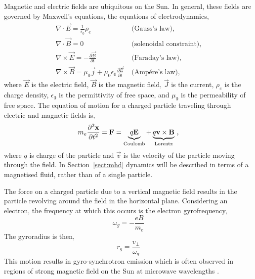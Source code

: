Magnetic and electric fields are ubiquitous on the Sun. %
In general, these fields are governed by Maxwell's equations, the equations of electrodynamics,
\begin{eqnarray}
\nabla \cdot \vec{E} = \frac{1}{\epsilon_0}\rho_e & \mbox{ (Gauss's law),} \\
\nabla \cdot \vec{B} = 0 & \mbox{ (solenoidal constraint),} \\
\nabla \times \vec{E} = -\frac{\partial \vec{B}}{\partial t} & \mbox{ (Faraday's law),} \\
\nabla \times \vec{B} = \mu_0\vec{j} + \mu_0 \epsilon_0 \frac{\partial \vec{E}}{\partial t} & \mbox{ (Amp\'ere's law),}
\end{eqnarray}
where $\vec{E}$ is the electric field, $\vec{B}$ is the magnetic field, $\vec{J}$ is the current, $\rho_e$ is the charge density, $\epsilon_0$ is the permittivity of free space, and $\mu_0$ is the permeability of free space. The equation of motion for a charged particle traveling through electric and magnetic fields is,
\begin{equation}\label{eqn:lorenz}
m_e \frac{\partial^2 \mathbf{x}}{\partial t^2} = \vec{F} = \underbrace{q\vec{E}}_{\mathrm{Coulomb}}+\underbrace{q\vec{v}\times\vec{B}}_{\mathrm{Lorentz}} \mbox{\,,}
\end{equation}
where $q$ is charge of the particle and $\vec{v}$ is the velocity of the particle moving through the field. In Section~\ref{sect:mhd} dynamics will be described in terms of a magnetised fluid, rather than of a single particle.
 
The force on a charged particle due to a vertical magnetic field results in the particle revolving around the field in the horizontal plane. Considering an electron, the frequency at which this occurs is the electron gyrofrequency,
\begin{equation}
\omega_g = -\frac{e B}{m_e}  
\end{equation}
The gyroradius is then,
\begin{equation}
r_g = \frac{v_\bot}{\omega_g}  
\end{equation}
This motion results in gyro-synchrotron emission which is often observed in regions of strong magnetic field on the Sun at microwave wavelengths \citep{Gopalswamy:2012}. 

